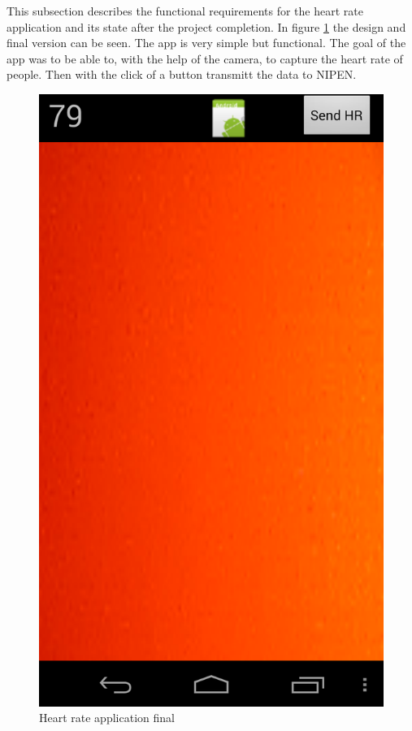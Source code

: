 This subsection describes the functional requirements for the heart rate application and its state after the project completion.
In figure \ref{figure:appfinal} the design and final version can be seen.
The app is very simple but functional. 
The goal of the app was to be able to, with the help of the camera, to capture the heart rate of people.
Then with the click of a button transmitt the data to NIPEN.


\begin{figure}[H]
\centering
\includegraphics[scale=0.20]{../Figures/appfinal.png}
\caption{Heart rate application final}
\label{figure:appfinal}
\end{figure}

